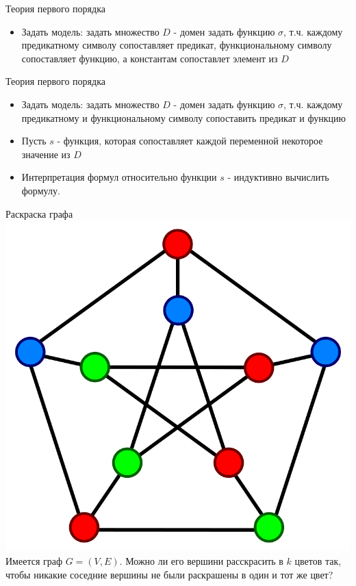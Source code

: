 \documentclass{beamer}
\begin{document}
\begin{frame}{Теория первого порядка}
\begin{itemize}
\item Задать модель:\newline
задать множество $D$ - домен\newline
задать функцию $\sigma$, т.ч. каждому предикатному символу сопоставляет предикат, функциональному символу сопоставляет функцию,
а константам сопоставлет элемент из $D$
\end{itemize}
\end{frame}

\begin{frame}{Теория первого порядка}
\begin{itemize}
\item Задать модель:\newline
задать множество $D$ - домен\newline
задать функцию $\sigma$, т.ч. каждому предикатному и функциональному символу сопоставить предикат и функцию
\item Пусть $s$ - функция, которая сопоставляет каждой переменной некоторое значение из $D$
\item Интерпретация формул относительно функции $s$ - индуктивно вычислить формулу.
\end{itemize}
\end{frame}

\begin{frame}{Раскраска графа}
\includegraphics[scale=0.1]{graph-coloring.svg.png}
Имеется граф $G = (V, E)$. Можно ли его вершини расскрасить в $k$ цветов так, чтобы никакие соседние вершины не были раскрашены
в один и тот же цвет?
\end{frame}
\end{document}
